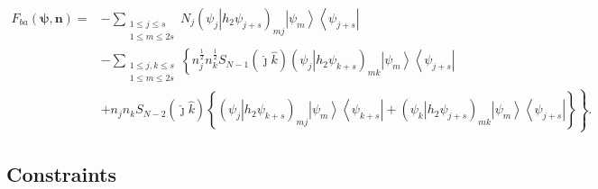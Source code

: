 \documentclass[aps,preprint]{revtex4}%
\begin{document}
\begin{align}
F_{ba}\left(  \mathbf{\psi,n}\right)  =  &  -\sum_{\substack{1\leq j\leq
s\\1\leq m\leq2s}}N_{j}\left(  \left.  \psi_{j}\right\vert h_{2}\psi
_{j+s}\right)  _{mj}\left\vert \psi_{m}\right\rangle \left\langle \psi
_{j+s}\right\vert \nonumber\\
&  -\sum_{\substack{1\leq j,k\leq s\\1\leq m\leq2s}}\left\{  n_{j}^{\frac
{1}{2}}n_{k}^{\frac{1}{2}}S_{N-1}\left(  \hat{\jmath}\hat{k}\right)  \right.
\left(  \left.  \psi_{j}\right\vert h_{2}\psi_{k+s}\right)  _{mk}\left\vert
\psi_{m}\right\rangle \left\langle \psi_{j+s}\right\vert \nonumber\\
&  +n_{j}n_{k}S_{N-2}\left(  \hat{\jmath}\hat{k}\right)  \left.  \overset
{}{\left\{  \left(  \left.  \psi_{j}\right\vert h_{2}\psi_{k+s}\right)
_{mj}\left\vert \psi_{m}\right\rangle \left\langle \psi_{k+s}\right\vert
+\left(  \left.  \psi_{k}\right\vert h_{2}\psi_{j+s}\right)  _{mk}\left\vert
\psi_{m}\right\rangle \left\langle \psi_{j+s}\right\vert \right\}  }\right\}
.
\end{align}


\subsection{Constraints}
\end{document}

